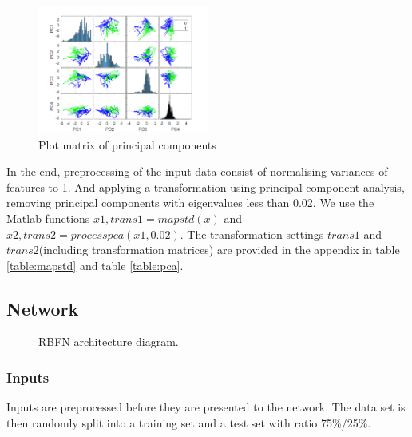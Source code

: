 \documentclass[a4paper, 11pt]{article}
\begin{document}
 

\begin{figure}[h]
  	\centering
    \includegraphics[width=0.5\textwidth]{../figures/pca_plotmatrix.png}
    \caption{Plot matrix of principal components}
	\label{fig:pca_plotmatrix}
\end{figure}


In the end, preprocessing of the input data consist of normalising variances of features to 1. And applying a transformation using principal component analysis, removing principal components with eigenvalues less than 0.02. We use the Matlab functions $x1, trans1 = mapstd(x)$ and $x2, trans2 = processpca(x1, 0.02)$. The transformation settings $trans1$ and $trans2$(including transformation matrices) are provided in the appendix in table \ref{table:mapstd} and table \ref{table:pca}.
  


\subsection{Network}
\begin{figure}[h]
\centering
  \caption{RBFN architecture diagram.}
  \label{fig:architecture}
\end{figure}

\subsubsection{Inputs}
Inputs are preprocessed before they are presented to the network. The data set is then randomly split into a training set and a test set with ratio 75\%/25\%.
\end{document}
